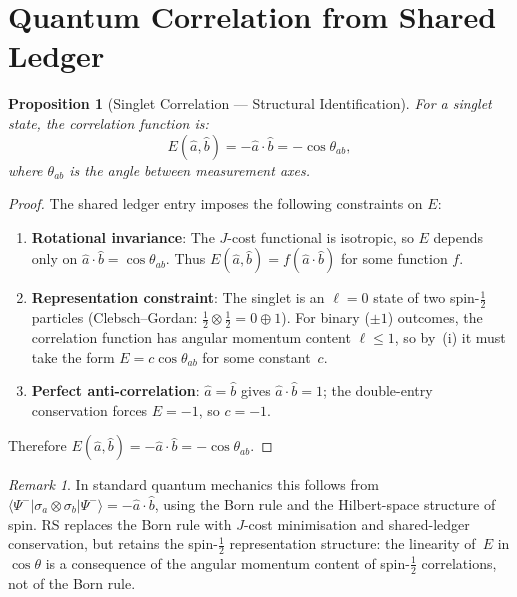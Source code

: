 \documentclass[12pt,a4paper]{article}
\newtheorem{proposition}[theorem]{Proposition}
\theoremstyle{definition}
\theoremstyle{remark}
\newtheorem{remark}[theorem]{Remark}
\begin{document}
\section{Quantum Correlation from Shared Ledger}
\label{sec:correlation}

\begin{proposition}[Singlet Correlation --- Structural Identification]
\label{thm:correlation}
For a singlet state, the correlation function is:
\begin{equation}
  \boxed{E(\hat{a}, \hat{b}) = -\hat{a} \cdot \hat{b}
  = -\cos\theta_{ab},}
\end{equation}
where $\theta_{ab}$ is the angle between measurement axes.
\end{proposition}

\begin{proof}
The shared ledger entry imposes the following constraints on $E$:
\begin{enumerate}[label=(\roman*),nosep]
  \item \textbf{Rotational invariance}: The $J$-cost functional is
  isotropic, so $E$ depends only on $\hat{a} \cdot \hat{b} = \cos\theta_{ab}$.
  Thus $E(\hat{a}, \hat{b}) = f(\hat{a} \cdot \hat{b})$ for some function $f$.

  \item \textbf{Representation constraint}: The singlet is an
  $\ell = 0$ state of two spin-$\tfrac{1}{2}$ particles
  (Clebsch--Gordan: $\tfrac{1}{2}\otimes\tfrac{1}{2} = 0 \oplus 1$).
  For binary ($\pm 1$) outcomes, the correlation function has
  angular momentum content $\ell \leq 1$, so by~(i) it must
  take the form $E = c\cos\theta_{ab}$ for some constant~$c$.

  \item \textbf{Perfect anti-correlation}: $\hat{a} = \hat{b}$
  gives $\hat{a} \cdot \hat{b} = 1$; the double-entry conservation
  forces $E = -1$, so $c = -1$.
\end{enumerate}
Therefore $E(\hat{a}, \hat{b}) = -\hat{a} \cdot \hat{b} = -\cos\theta_{ab}$.
\end{proof}

\begin{remark}
In standard quantum mechanics this follows from
$\langle\Psi^-|\sigma_a \otimes \sigma_b|\Psi^-\rangle =
-\hat{a}\cdot\hat{b}$, using the Born rule and the Hilbert-space
structure of spin.  RS replaces the Born rule with $J$-cost
minimisation and shared-ledger conservation, but retains the
spin-$\tfrac{1}{2}$ representation structure: the linearity of~$E$
in $\cos\theta$ is a consequence of the angular momentum content
of spin-$\tfrac{1}{2}$ correlations, not of the Born rule.
\end{remark}
\end{document}

